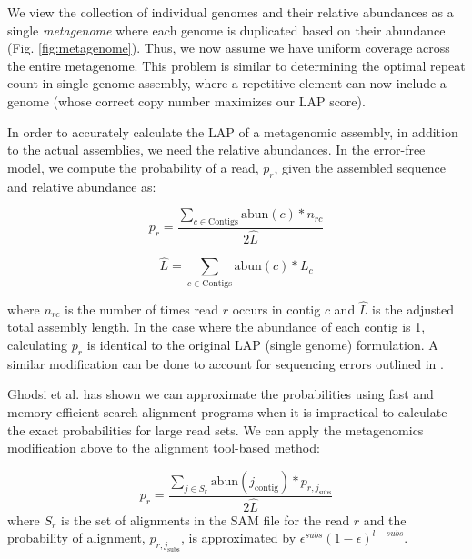 \documentclass[conference]{IEEEtran}
\begin{document}
We view the collection of individual genomes and their relative abundances as a single \emph{metagenome} where each genome is duplicated based on their abundance (Fig. \ref{fig:metagenome}).
Thus, we now assume we have uniform coverage across the entire metagenome.
This problem is similar to determining the optimal repeat count in single genome assembly, where a repetitive element can now include a genome (whose correct copy number maximizes our LAP score).

In order to accurately calculate the LAP of a metagenomic assembly, in addition to the actual assemblies, we need the relative abundances.
In the error-free model, we compute the probability of a read, $p_r$, given the assembled sequence and relative abundance as:

\begin{equation}
  \label{meta_read_probability}
  p_r = \frac{\sum_{c \in \text{Contigs}}\text{abun}(c)*n_{rc}}{2\hat{L}}
\end{equation}

\begin{equation}
  \label{meta_read_length}
  \hat{L} = \sum_{c \in \text{Contigs}}\text{abun}(c)*L_{c}
\end{equation}

where $n_{rc}$ is the number of times read $r$ occurs in contig $c$ and $\hat{L}$ is the adjusted total assembly length.  In the case where the abundance of each contig is 1, calculating $p_r$ is identical to the original LAP (single genome) formulation.  A similar modification can be done to account for sequencing errors outlined in \cite{LAP}.

Ghodsi et al. has shown we can approximate the probabilities using fast and memory efficient search alignment programs when it is impractical to calculate the exact probabilities for large read sets.
We can apply the metagenomics modification above to the alignment tool-based method:

\begin{equation}
\label{}
p_{r} = \frac{\sum_{j \in S_r} \text{abun}(j_{\text{contig}})*p_{r,j_{\text{subs}}}}{2\hat{L}}
\end{equation}
where $S_r$ is the set of alignments in the SAM file for the read $r$ and the probability of alignment, $p_{r,j_{\text{subs}}}$, is approximated by $\epsilon^{subs}(1 - \epsilon)^{l - subs}$.
\end{document}
